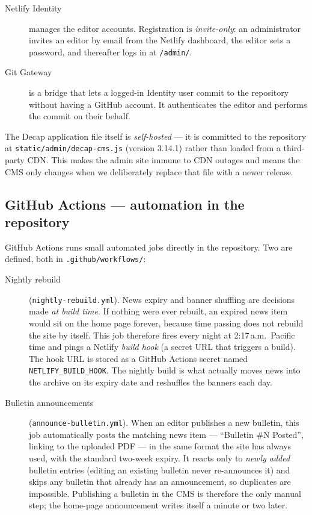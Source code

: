 \documentclass[12pt,letterpaper]{article}
\begin{document}
\begin{description}
  \item[Netlify Identity] manages the editor accounts. Registration is
  \emph{invite-only}: an administrator invites an editor by email from the
  Netlify dashboard, the editor sets a password, and thereafter logs in at
  \texttt{/admin/}.

  \item[Git Gateway] is a bridge that lets a logged-in Identity user commit
  to the repository without having a GitHub account. It authenticates the
  editor and performs the commit on their behalf.
\end{description}

The Decap application file itself is \emph{self-hosted} --- it is committed
to the repository at \texttt{static/admin/decap-cms.js} (version 3.14.1)
rather than loaded from a third-party CDN. This makes the admin site immune
to CDN outages and means the CMS only changes when we deliberately replace
that file with a newer release.

\subsection{GitHub Actions --- automation in the repository}

GitHub Actions runs small automated jobs directly in the repository. Two
are defined, both in \texttt{.github/workflows/}:

\begin{description}
  \item[Nightly rebuild] (\texttt{nightly-rebuild.yml}). News expiry and
  banner shuffling are decisions made \emph{at build time}. If nothing were
  ever rebuilt, an expired news item would sit on the home page forever,
  because time passing does not rebuild the site by itself. This job
  therefore fires every night at 2:17\,a.m.\ Pacific time and pings a
  Netlify \emph{build hook} (a secret URL that triggers a build). The hook
  URL is stored as a GitHub Actions secret named
  \texttt{NETLIFY\_BUILD\_HOOK}. The nightly build is what actually moves
  news into the archive on its expiry date and reshuffles the banners each
  day.

  \item[Bulletin announcements] (\texttt{announce-bulletin.yml}). When an
  editor publishes a new bulletin, this job automatically posts the
  matching news item --- ``Bulletin \#N Posted'', linking to the uploaded
  PDF --- in the same format the site has always used, with the standard
  two-week expiry. It reacts only to \emph{newly added} bulletin entries
  (editing an existing bulletin never re-announces it) and skips any
  bulletin that already has an announcement, so duplicates are impossible.
  Publishing a bulletin in the CMS is therefore the only manual step; the
  home-page announcement writes itself a minute or two later.
\end{description}
\end{document}
